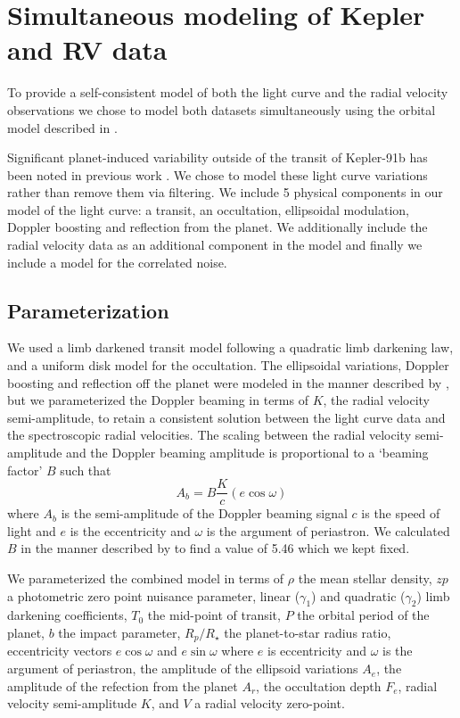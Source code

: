 \documentclass[apjl]{emulateapj}
\begin{document}
\section{Simultaneous modeling of Kepler and RV data}
To provide a self-consistent model of both the light curve and the radial velocity observations we chose to model both datasets simultaneously using the orbital model described in \citet{rowe14}.

Significant planet-induced variability outside of the transit of Kepler-91b has been noted in previous work \citep{lillo14,esteves13}. We chose to model these light curve variations rather than remove them via filtering.  We include 5 physical components in our model of the light curve: a transit, an occultation, ellipsoidal modulation, Doppler boosting and reflection from the planet. We additionally include the radial velocity data as an additional component in the model and finally we include a model for the correlated noise.

\subsection{Parameterization}
We used a limb darkened transit model \citep{mandel02} following a quadratic limb darkening law, and a uniform disk model for the occultation. The ellipsoidal variations, Doppler boosting and reflection off the planet were modeled in the manner described by \citet{lillo14}, but we parameterized the Doppler beaming in terms of $K$, the radial velocity semi-amplitude, to retain a consistent solution between the light curve data and the spectroscopic radial velocities. The scaling between the radial velocity semi-amplitude and the Doppler beaming amplitude is proportional to a `beaming factor' $B$ such that
\begin{equation}
A_b = B \frac{K}{c} (e\cos{\omega})
\end{equation}
where $A_b$ is the semi-amplitude of the Doppler beaming signal $c$ is the speed of light and $e$ is the eccentricity and $\omega$ is the argument of periastron. We calculated $B$ in the manner described by \citet{bloemen11} to find a value of 5.46 which we kept fixed.

We parameterized the combined model in terms of $\rho$ the mean stellar density, $zp$ a photometric zero point nuisance parameter, linear ($\gamma_1$) and quadratic ($\gamma_2$) limb darkening coefficients, $T_0$ the mid-point of transit, $P$ the orbital period of the planet, $b$ the impact parameter, $R_{p}/R_{\star}$ the planet-to-star radius ratio, eccentricity vectors $e\cos{\omega}$ and $e\sin{\omega}$ where $e$ is eccentricity and $\omega$ is the argument of periastron, the amplitude of the ellipsoid variations $A_e$, the amplitude of the refection from the planet $A_r$, the occultation depth $F_e$, radial velocity semi-amplitude $K$, and $V$ a radial velocity zero-point.
\end{document}
